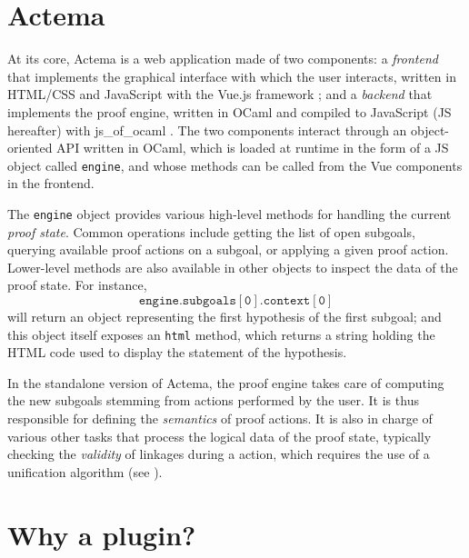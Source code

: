 \section{Actema}

At its core, Actema is a web application made of two components: a
\emph{frontend} that implements the graphical interface with which the user
interacts, written in HTML/CSS and JavaScript with the Vue.js framework
; and a \emph{backend} that implements the proof engine, written in
OCaml and compiled to JavaScript (JS hereafter) with js\_of\_ocaml
. The two components interact through an
object-oriented API written in OCaml, which is loaded at runtime in the form of
a JS object called \texttt{engine}, and whose methods can be called from the Vue
components in the frontend.

The \texttt{engine} object provides various high-level methods for handling the
current \emph{proof state}. Common operations include getting the list of open
subgoals, querying available proof actions on a subgoal, or applying a given
proof action. Lower-level methods are also available in other objects to inspect
the data of the proof state. For instance,
$$\mathtt{engine.subgoals[0].context[0]}$$
will return an object representing the first hypothesis of the first subgoal;
and this object itself exposes an \texttt{html} method, which returns a string
holding the HTML code used to display the statement of the hypothesis.


In the standalone version of Actema, the proof engine takes care of computing
the new subgoals stemming from actions performed by the user. It is thus
responsible for defining the \emph{semantics} of proof actions. It is also in
charge of various other tasks that process the logical data of the proof state,
typically checking the \emph{validity} of linkages during a  action, which
requires the use of a unification algorithm (see ).

\section{Why a plugin?}


